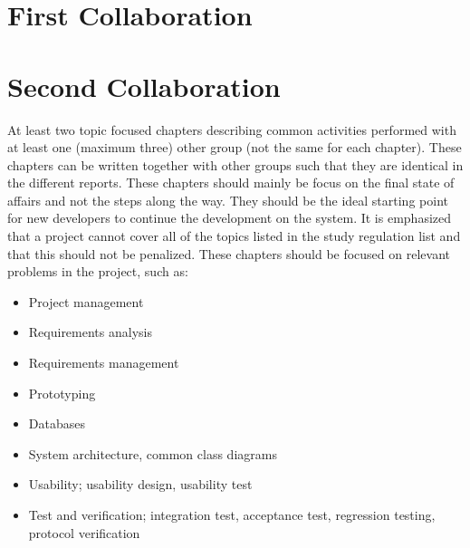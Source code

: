 \chapter{First Collaboration}

\chapter{Second Collaboration}


At least two topic focused chapters describing common activities performed with at least one (maximum three) other group (not the same for each chapter). These chapters can be written together with other groups such that they are identical in the different reports. These chapters should mainly be focus on the final state of affairs and not the steps along the way. They should be the ideal starting point for new developers to continue the development on the system. It is emphasized that a project cannot cover all of the topics listed in the study regulation list and that this should not be penalized. These chapters should be focused on relevant problems in the project, such as:

\begin{itemize}
	\item Project management
	\item Requirements analysis
	\item Requirements management
	\item Prototyping
	\item Databases
	\item System architecture, common class diagrams
	\item Usability; usability design, usability test
	\item Test and verification; integration test, acceptance test, regression testing, protocol verification
\end{itemize}
